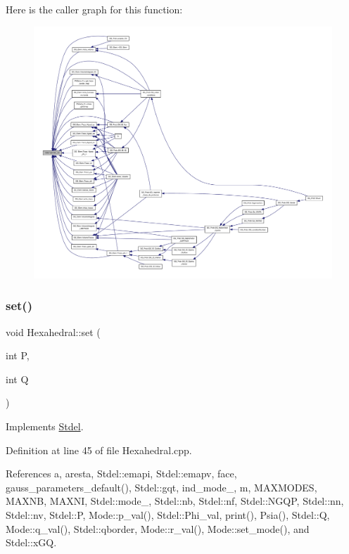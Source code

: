 Here is the caller graph for this function\+:
\nopagebreak
\begin{figure}[H]
\begin{center}
\leavevmode
\includegraphics[width=350pt]{classStdel_a457d20e34fb7a32eb1e4aca6c19f53a2_icgraph}
\end{center}
\end{figure}
\mbox{\label{classHexahedral_aed81c3a2149b36e9bdc0dd67bc5f3bdc}} 
\subsubsection{\texorpdfstring{set()}{set()}}
{\footnotesize\ttfamily void Hexahedral\+::set (\begin{DoxyParamCaption}\item[{int}]{P,  }\item[{int}]{Q }\end{DoxyParamCaption})\hspace{0.3cm}{\ttfamily [virtual]}}



Implements \hyperlink{classStdel_ab42c46493ab17be6f2642a558fea8a05}{Stdel}.



Definition at line 45 of file Hexahedral.\+cpp.



References a, aresta, Stdel\+::emapi, Stdel\+::emapv, face, gauss\+\_\+parameters\+\_\+default(), Stdel\+::gqt, ind\+\_\+mode\+\_\+, m, M\+A\+X\+M\+O\+D\+ES, M\+A\+X\+NB, M\+A\+X\+NI, Stdel\+::mode\+\_\+, Stdel\+::nb, Stdel\+::nf, Stdel\+::\+N\+G\+QP, Stdel\+::nn, Stdel\+::nv, Stdel\+::P, Mode\+::p\+\_\+val(), Stdel\+::\+Phi\+\_\+val, print(), Psia(), Stdel\+::Q, Mode\+::q\+\_\+val(), Stdel\+::qborder, Mode\+::r\+\_\+val(), Mode\+::set\+\_\+mode(), and Stdel\+::x\+GQ.

